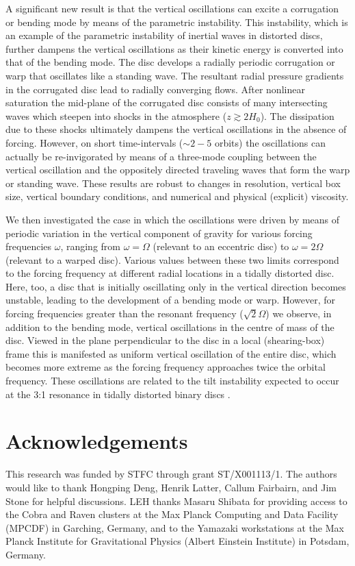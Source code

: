 \documentclass[fleqn,usenatbib]{mnras}
\begin{document}
A significant new result is that the vertical oscillations can excite a corrugation or bending mode by means of the parametric instability. This instability, which is an example of the parametric instability of inertial waves in distorted discs, further dampens the vertical oscillations as their kinetic energy is converted into that of the bending mode. The disc develops a radially periodic corrugation or warp that oscillates like a standing wave. The resultant radial pressure gradients in the corrugated disc lead to radially converging flows. After nonlinear saturation the mid-plane of the corrugated disc consists of many intersecting waves which steepen into shocks in the atmosphere ($z \gtrsim 2H_0$). The dissipation due to these shocks ultimately dampens the vertical oscillations in the absence of forcing. However, on short time-intervals ($\sim 2-5$ orbits) the oscillations can actually be re-invigorated by means of a three-mode coupling between the vertical oscillation and the oppositely directed traveling waves that form the warp or standing wave. These results are robust to changes in resolution, vertical box size, vertical boundary conditions, and numerical and physical (explicit) viscosity.

We then investigated the case in which the oscillations were driven by means of periodic variation in the vertical component of gravity for various forcing frequencies $\omega$, ranging from $\omega=\Omega$ (relevant to an eccentric disc) to $\omega= 2\Omega$ (relevant to a warped disc). Various values between these two limits correspond to the forcing frequency at different radial locations in a tidally distorted disc. Here, too, a disc that is initially oscillating only in the vertical direction becomes unstable, leading to the development of a bending mode or warp. However, for forcing frequencies greater than the resonant frequency ($\sqrt{2}\Omega$) we observe, in addition to the bending mode, vertical oscillations in the centre of mass of the disc. Viewed in the plane perpendicular to the disc in a local (shearing-box) frame this is manifested as uniform vertical oscillation of the entire disc, which becomes more extreme as the forcing frequency approaches twice the orbital frequency. These oscillations are related to the tilt instability expected to occur at the 3:1 resonance in tidally distorted binary discs \citep{lubow1992tidally}.


\section*{Acknowledgements}
This research was funded by STFC through grant ST/X001113/1.
The authors would like to thank Hongping Deng, Henrik Latter, Callum Fairbairn, and Jim Stone for helpful discussions. LEH thanks Masaru Shibata for providing access to the Cobra and Raven clusters at the Max Planck Computing and Data Facility (MPCDF) in Garching, Germany, and to the Yamazaki workstations at the Max Planck Institute for Gravitational Physics (Albert Einstein Institute) in Potsdam, Germany.
\end{document}
